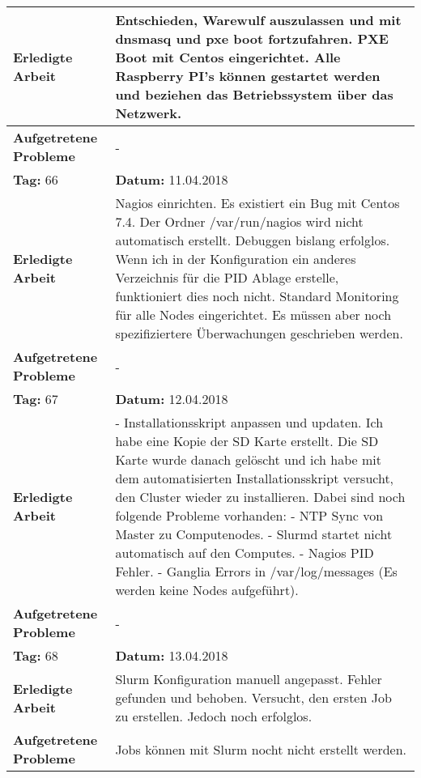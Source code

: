 \begin{longtable}{|p{5cm}|p{5cm}p{6cm}|}
\textbf{Erledigte Arbeit} & \multicolumn{2}{p{11cm}|}{Entschieden, Warewulf auszulassen und mit dnsmasq und pxe boot fortzufahren. PXE Boot mit Centos eingerichtet. Alle Raspberry PI's können gestartet werden und beziehen das Betriebssystem über das Netzwerk.} \\ \hline
\textbf{Aufgetretene Probleme} & \multicolumn{2}{p{11cm}|}{-} \\ \hline
\rowcolor{heading}\textbf{Tag:} 66 & \textbf{Datum:} 11.04.2018 & \\ \hline
\textbf{Erledigte Arbeit} & \multicolumn{2}{p{11cm}|}{Nagios einrichten. Es existiert ein Bug mit Centos 7.4. Der Ordner /var/run/nagios wird nicht automatisch erstellt. Debuggen bislang erfolglos. Wenn ich in der Konfiguration ein anderes Verzeichnis für die PID Ablage erstelle, funktioniert dies noch nicht. Standard Monitoring für alle Nodes eingerichtet. Es müssen aber noch spezifiziertere Überwachungen geschrieben werden.} \\ \hline
\textbf{Aufgetretene Probleme} & \multicolumn{2}{p{11cm}|}{-} \\ \hline
\rowcolor{heading}\textbf{Tag:} 67 & \textbf{Datum:} 12.04.2018 & \\ \hline
\textbf{Erledigte Arbeit} & \multicolumn{2}{p{11cm}|}{- Installationsskript anpassen und updaten. Ich habe eine Kopie der SD Karte erstellt. Die SD Karte wurde danach gelöscht und ich habe mit dem automatisierten Installationsskript versucht, den Cluster wieder zu installieren. Dabei sind noch folgende Probleme vorhanden: \newline - NTP Sync von Master zu Computenodes. \newline
- Slurmd startet nicht automatisch auf den Computes. \newline 
- Nagios PID Fehler. \newline 
- Ganglia Errors in /var/log/messages (Es werden keine Nodes aufgeführt).} \\ \hline
\textbf{Aufgetretene Probleme} & \multicolumn{2}{p{11cm}|}{-} \\ \hline
\rowcolor{heading}\textbf{Tag:} 68 & \textbf{Datum:} 13.04.2018 & \\ \hline
\textbf{Erledigte Arbeit} & \multicolumn{2}{p{11cm}|}{Slurm Konfiguration manuell angepasst. Fehler gefunden und behoben. Versucht, den ersten Job zu erstellen. Jedoch noch erfolglos.} \\ \hline
\textbf{Aufgetretene Probleme} & \multicolumn{2}{p{11cm}|}{Jobs können mit Slurm nocht nicht erstellt werden.} \\ \hline

\end{longtable}
